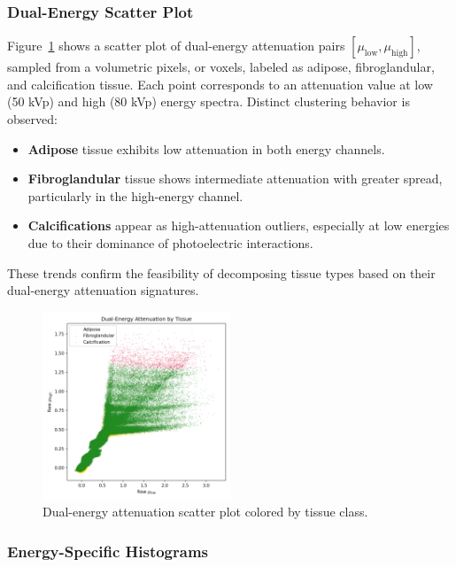\subsubsection{Dual-Energy Scatter Plot}

Figure~\ref{fig:scatter} shows a scatter plot of dual-energy attenuation pairs \([\mu_{\text{low}}, \mu_{\text{high}}]\),
sampled from a volumetric pixels, or voxels, labeled as adipose, fibroglandular, and calcification tissue. Each point corresponds to an
attenuation value at low (50 kVp) and high (80 kVp) energy spectra. Distinct clustering behavior is observed:

\begin{itemize}
    \item \textbf{Adipose} tissue exhibits low attenuation in both energy channels.
    \item \textbf{Fibroglandular} tissue shows intermediate attenuation with greater spread, particularly in the high-energy channel.
    \item \textbf{Calcifications} appear as high-attenuation outliers, especially at low energies due to their dominance of photoelectric interactions.
\end{itemize}

These trends confirm the feasibility of decomposing tissue types based on their dual-energy attenuation signatures.

\begin{figure}[h!]
    \centering
    \includegraphics[width=0.5\textwidth]{./fig/attenuation_scatter.png}
    \caption{Dual-energy attenuation scatter plot colored by tissue class.}
    \label{fig:scatter}
\end{figure}

\subsubsection{Energy-Specific Histograms}

